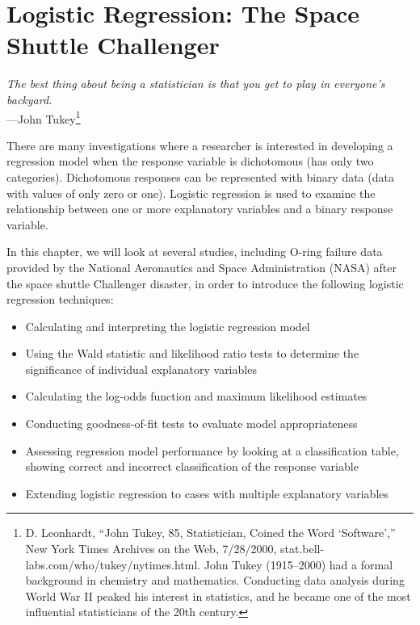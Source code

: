\documentclass[
]{book}
\providecommand{\tightlist}{%
  \setlength{\itemsep}{0pt}\setlength{\parskip}{0pt}}
\begin{document}
\hypertarget{logistic-regression-the-space-shuttle-challenger}{%
\chapter{Logistic Regression: The Space Shuttle Challenger}\label{logistic-regression-the-space-shuttle-challenger}}

\begin{flushright}
\emph{The best thing about being a statistician is that you get to play in everyone’s backyard.} \\
—John Tukey\footnote{D. Leonhardt, “John Tukey, 85, Statistician, Coined the Word ‘Software’,” New York Times Archives on the Web, 7/28/2000, stat.bell-labs.com/who/tukey/nytimes.html. John Tukey (1915–2000) had a formal background in chemistry and mathematics. Conducting data analysis during World War II peaked his interest in statistics, and he became one of the most influential statisticians of the 20th century.}
\end{flushright}

There are many investigations where a researcher is interested in developing a regression model when the response variable is dichotomous (has only two categories). Dichotomous responses can be represented with binary data (data with values of only zero or one). Logistic regression is used to examine the relationship between one or more explanatory variables and a binary response variable.

In this chapter, we will look at several studies, including O-ring failure data provided by the National Aeronautics and Space Administration (NASA) after the space shuttle Challenger disaster, in order to introduce the following logistic regression techniques:

\begin{itemize}
\tightlist
\item
  Calculating and interpreting the logistic regression model\\
\item
  Using the Wald statistic and likelihood ratio tests to determine the significance of individual explanatory variables\\
\item
  Calculating the log-odds function and maximum likelihood estimates\\
\item
  Conducting goodness-of-fit tests to evaluate model appropriateness\\
\item
  Assessing regression model performance by looking at a classification table, showing correct and incorrect classification of the response variable\\
\item
  Extending logistic regression to cases with multiple explanatory variables
\end{itemize}
\end{document}
